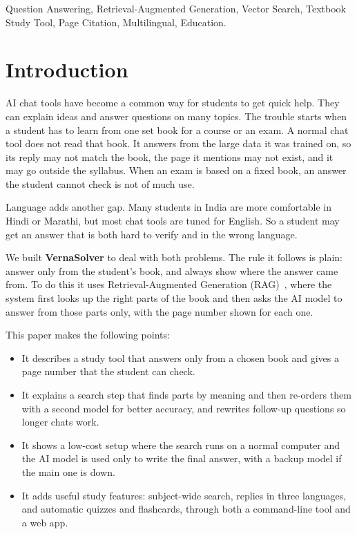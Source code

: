 \documentclass[journal]{IEEEtran}
\begin{document}
\begin{IEEEkeywords}
Question Answering, Retrieval-Augmented Generation, Vector Search,
Textbook Study Tool, Page Citation, Multilingual, Education.
\end{IEEEkeywords}

\IEEEpeerreviewmaketitle

\section{Introduction}
AI chat tools have become a common way for students to get quick help.
They can explain ideas and answer questions on many topics. The trouble
starts when a student has to learn from one set book for a course or an
exam. A normal chat tool does not read that book. It answers from the
large data it was trained on, so its reply may not match the book, the
page it mentions may not exist, and it may go outside the syllabus. When
an exam is based on a fixed book, an answer the student cannot check is
not of much use.

Language adds another gap. Many students in India are more comfortable in
Hindi or Marathi, but most chat tools are tuned for English. So a student
may get an answer that is both hard to verify and in the wrong language.

We built \textbf{VernaSolver} to deal with both problems. The rule it
follows is plain: answer only from the student's book, and always show
where the answer came from. To do this it uses Retrieval-Augmented
Generation (RAG)~\cite{lewis2020rag}, where the system first looks up the
right parts of the book and then asks the AI model to answer from those
parts only, with the page number shown for each one.

This paper makes the following points:
\begin{itemize}
\item It describes a study tool that answers only from a chosen book and
gives a page number that the student can check.
\item It explains a search step that finds parts by meaning and then
re-orders them with a second model for better accuracy, and rewrites
follow-up questions so longer chats work.
\item It shows a low-cost setup where the search runs on a normal
computer and the AI model is used only to write the final answer, with a
backup model if the main one is down.
\item It adds useful study features: subject-wide search, replies in
three languages, and automatic quizzes and flashcards, through both a
command-line tool and a web app.
\end{itemize}
\end{document}
